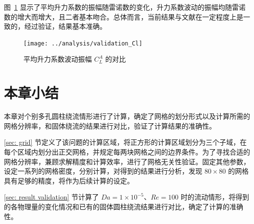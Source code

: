 

图~\ref{fig: validation-Cl} 显示了平均升力系数的振幅随雷诺数的变化，升力系数波动的振幅均随雷诺数的增大而增大，且二者基本吻合。总体而言，当前结果与文献在一定程度上是一致的，经过验证，结果基本准确。

\begin{figure}
	\centering
	\texttt{[image: ../analysis/validation\_Cl]}
	\caption{平均升力系数波动振幅 $C_L^A$ 的对比}
	\label{fig: validation-Cl}
\end{figure}

\section{本章小结}

本章对个别多孔圆柱绕流情形进行了计算，确定了网格的划分形式以及计算所需的网格分辨率，和固体绕流的结果进行对比，验证了计算结果的准确性。

\ref{sec: grid} 节定义了该问题的计算区域，将正方形的计算区域划分为三个子域，在每个区域内划分出正交网格，并规定每两块网格之间的边界条件。为了寻找合适的网格分辨率，兼顾求解精度和计算效率，进行了网格无关性验证。固定其他参数，设定一系列的网格密度，分别计算，对得到的结果进行分析，发现 $80\times 80$ 的网格具有足够的精度，将作为后续计算的设定。

\ref{sec: result validation} 节计算了 $Da=1\times 10^{-5}$、$Re=100$ 时的流动情形，将得到的各物理量的变化情况和已有的固体圆柱绕流结果进行对比，确定了计算的准确性。
